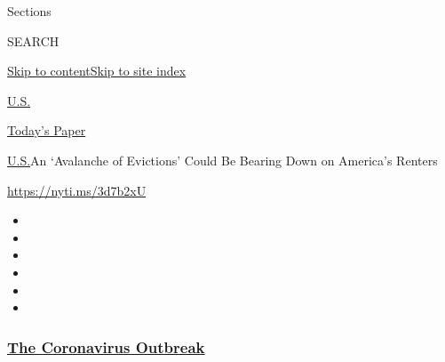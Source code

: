 Sections

SEARCH

\protect\hyperlink{site-content}{Skip to
content}\protect\hyperlink{site-index}{Skip to site index}

\href{https://www.nytimes3xbfgragh.onion/section/us}{U.S.}

\href{https://myaccount.nytimes3xbfgragh.onion/auth/login?response_type=cookie\&client_id=vi}{}

\href{https://www.nytimes3xbfgragh.onion/section/todayspaper}{Today's
Paper}

\href{/section/us}{U.S.}\textbar{}An `Avalanche of Evictions' Could Be
Bearing Down on America's Renters

\url{https://nyti.ms/3d7b2xU}

\begin{itemize}
\item
\item
\item
\item
\item
\item
\end{itemize}

\hypertarget{the-coronavirus-outbreak}{%
\subsubsection{\texorpdfstring{\href{https://www.nytimes3xbfgragh.onion/news-event/coronavirus?name=styln-coronavirus-national\&region=TOP_BANNER\&variant=undefined\&block=storyline_menu_recirc\&action=click\&pgtype=Article\&impression_id=acc5c330-e397-11ea-922b-e97d4ae673ca}{The
Coronavirus
Outbreak}}{The Coronavirus Outbreak}}\label{the-coronavirus-outbreak}}

